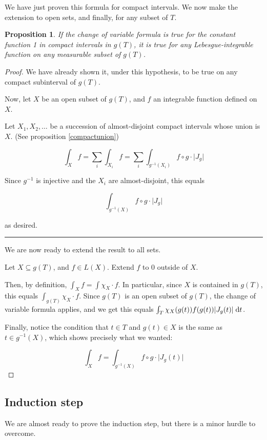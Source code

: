 \documentclass[11pt]{article}
\theoremstyle{definition}
\theoremstyle{plain}
\newtheorem{prop}{Proposition}
\newcommand{\mo}{^{-1}}
\begin{document}
We have just proven this formula for compact intervals. We now make the extension to open sets, and finally, for any subset of $T$.

\begin{prop}
If the change of variable formula is true for the constant function 1 in compact intervals in $g(T)$, it is true for any Lebesgue-integrable function on any measurable subset of $g(T)$.
\end{prop}

\begin{proof}
We have already shown it, under this hypothesis, to be true on any compact subinterval of $g(T)$.

Now, let $X$ be an open subset of $g(T)$, and $f$ an integrable function defined on $X$.

Let $X_1, X_2, \ldots$ be a succession of almost-disjoint compact intervals whose union is $X$. (See proposition \ref{compactunion})

\[\int_{X} f = \sum_i \int_{X_i} f = \sum_i \int_{g\mo(X_i)} f \circ g \cdot \lvert J_g \rvert\]

Since $g\mo$ is injective and the $X_i$ are almost-disjoint, this equals

\[\int_{g\mo(X)} f \circ g \cdot \lvert J_g \rvert\]

as desired.

\noindent\rule{\textwidth}{1pt}

We are now ready to extend the result to all sets.

Let $X \subseteq g(T)$, and $f \in L(X)$. Extend $f$ to 0 outside of $X$.

Then, by definition, $\int_X f = \int \chi_X \cdot f$. In particular, since $X$ is contained in $g(T)$, this equals $\int_{g(T)} \chi_X \cdot f$. Since $g(T)$ is an open subset of $g(T)$, the change of variable formula applies, and we get this equals $\int_{T} \chi_X(g(t)) f(g(t)) \lvert J_g(t) \rvert \d{t}$.

Finally, notice the condition that $t \in T$ and $g(t) \in X$ is the same as $t \in g\mo(X)$, which shows precisely what we wanted:

\[ \int_X f = \int_{g\mo(X)} f \circ g \cdot \lvert J_g(t) \rvert \]
\end{proof}

\subsection{Induction step}

We are almost ready to prove the induction step, but there is a minor hurdle to overcome.
\end{document}
